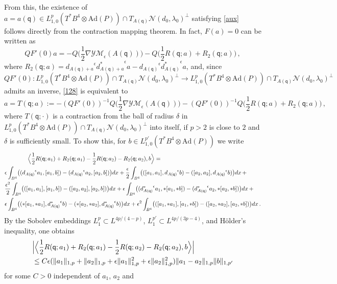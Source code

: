 \documentclass[11pt]{article}
\numberwithin{equation}{section} \setlength{\topmargin}{-35pt}
\newcommand{\Ad}{\text{Ad}}
\newcommand{\YMe}{\mathcal{YM}_{\epsilon}}
\newcommand{\q}{\mathsf{q}}
\begin{document}
From this, the existence of $a=a(\q)\in
L^p_{1,0}(T^{\ast}B^4\otimes\Ad(P))\cap
T_{A(\q)}\mathcal{N}(d_0,\lambda_0)^{\perp}$ satisfying \eqref{aux}
follows directly from the contraction mapping theorem. In fact,
$F(a)=0$ can be written as
\begin{equation}
\label{128} QF'(0)a=-
Q\Big(\frac{1}{2}\nabla\YMe(A(\q))\Big)-Q\Big(\frac{1}{2}R(\q;a)+R_2(\q;a)\Big)\,,
\end{equation}
where
$R_2(\q;a)={d_{A(\q)+a}}^{\epsilon}{d_{A(\q)+a}^{\ast}}^{\epsilon}a-{d_{A(\q)}}^{\epsilon}{d_{A(\q)}^{\ast}}^{\epsilon}a$,
and, since $QF'(0): L^p_{1,0}(T^{\ast}B^4\otimes\Ad(P))\cap
T_{A(\q)}\mathcal{N}(d_0,\lambda_0)^{\perp}\to
L^p_{1,0}(T^{\ast}B^4\otimes\Ad(P))\cap
T_{A(\q)}\mathcal{N}(d_0,\lambda_0)^{\perp}$ admits an inverse,
\eqref{128} is equivalent to
\begin{equation}
\label{129}
 a=T(\q;a)
:=-(QF'(0))^{-1}Q\Big(\frac{1}{2}\nabla\YMe(A(\q))\Big)-(QF'(0))^{-1}Q\Big(\frac{1}{2}R(\q;a)+R_2(\q;a)\Big)\,,
\end{equation}
where $T(\q;\cdot)$ is a contraction from the ball of radius
$\delta$ in $L^p_{1,0}(T^{\ast}B^4\otimes\Ad(P))\cap
T_{A(\q)}\mathcal{N}(d_0,\lambda_0)^{\perp}$ into itself, if $p>2$
is close to $2$ and $\delta$ is sufficiently small. To show this,
for $b\in L^{p'}_{1,0}(T^{\ast}B^4\otimes\Ad(P))$ we write
\begin{align}
&\qquad\qquad\Big\langle\frac{1}{2}R(\q;a_1)+R_2(\q;a_1)-\frac{1}{2}R(\q;a_2)-R_2(\q;a_2),b\Big\rangle=\notag\\
&\epsilon\int_{B^4}\bigl(({d_{A(\q)}}^{\epsilon}a_1,[a_1,b])-({d_{A(\q)}}^{\epsilon}a_2,[a_2,b])\bigr)dx+
\frac{\epsilon}{2}\int_{B^4}\bigl(([a_1,a_1],{d_{A(\q)}}^{\epsilon}b)-([a_2,a_2],{d_{A(\q)}}^{\epsilon}b)\bigr)dx\,+\notag\\
&\frac{\epsilon^2}{2}\int_{B^4}\bigl(([a_1,a_1],[a_1,b])-([a_2,a_2],[a_2,b])\bigr)dx+
\epsilon\int_{B^4}\bigl(({d_{A(\q)}^{\ast}}^{\epsilon}a_1,\ast[a_1,\ast b])-({d_{A(\q)}^{\ast}}^{\epsilon}a_2,\ast[a_2,\ast b])\bigr)dx\,+\notag\\
&\epsilon\int_{B^4}\bigl((\ast[a_1,\ast
a_1],{d_{A(\q)}^{\ast}}^{\epsilon}b)-(\ast[a_2,\ast
a_2],{d_{A(\q)}^{\ast}}^{\epsilon}b)\bigr)dx
+\epsilon^2\int_{B^4}\bigl(([a_1,\ast a_1],[a_1,\ast b])-([a_2,\ast
a_2],[a_2,\ast b])\bigr)dx\,.\notag
\end{align}
By the Sobolev embeddings $L^p_1\subset L^{4p/(4-p)}$,
$L^{p'}_1\subset L^{4p/(3p-4)}$, and H\"older's inequality, one
obtains
\begin{align}
&\Big|\Big\langle\frac{1}{2}R(\q;a_1)+R_2(\q;a_1)-\frac{1}{2}R(\q;a_2)-R_2(\q;a_2),b\Big\rangle\Big|\notag\\
&\le
C\epsilon(\|a_1\|_{1,p}+\|a_2\|_{1,p}+\epsilon\|a_1\|_{1,p}^2+\epsilon\|a_2\|_{1,p}^2)\|a_1-a_2\|_{1,p}\|b\|_{1,p'}
\notag\end{align} for some $C>0$ independent of $a_1$, $a_2$ and
\end{document}
